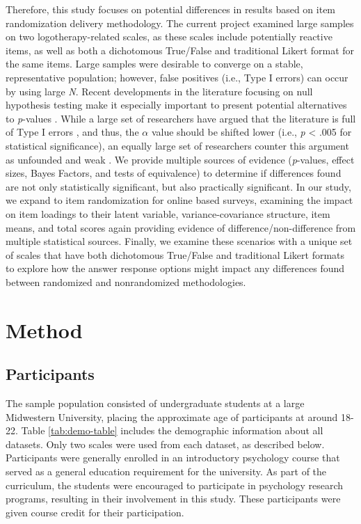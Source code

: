 \documentclass[english,man, mask]{apa6}
\theoremstyle{definition}
\theoremstyle{definition}
\theoremstyle{definition}
\theoremstyle{remark}
\begin{document}
Therefore, this study focuses on potential differences in results based
on item randomization delivery methodology. The current project examined
large samples on two logotherapy-related scales, as these scales include
potentially reactive items, as well as both a dichotomous True/False and
traditional Likert format for the same items. Large samples were
desirable to converge on a stable, representative population; however,
false positives (i.e., Type I errors) can occur by using large \emph{N}.
Recent developments in the literature focusing on null hypothesis
testing make it especially important to present potential alternatives
to \emph{p}-values \autocite{Valentine2017}. While a large set of
researchers have argued that the literature is full of Type I errors
\autocite{Benjamin2017}, and thus, the \(\alpha\) value should be
shifted lower (i.e., \emph{p} \textless{} .005 for statistical
significance), an equally large set of researchers counter this argument
as unfounded and weak \autocite{Lakens2017}. We provide multiple sources
of evidence (\emph{p}-values, effect sizes, Bayes Factors, and tests of
equivalence) to determine if differences found are not only
statistically significant, but also practically significant. In our
study, we expand to item randomization for online based surveys,
examining the impact on item loadings to their latent variable,
variance-covariance structure, item means, and total scores again
providing evidence of difference/non-difference from multiple
statistical sources. Finally, we examine these scenarios with a unique
set of scales that have both dichotomous True/False and traditional
Likert formats to explore how the answer response options might impact
any differences found between randomized and nonrandomized
methodologies.

\section{Method}\label{method}

\subsection{Participants}\label{participants}

The sample population consisted of undergraduate students at a large
Midwestern University, placing the approximate age of participants at
around 18-22. Table \ref{tab:demo-table} includes the demographic
information about all datasets. Only two scales were used from each
dataset, as described below. Participants were generally enrolled in an
introductory psychology course that served as a general education
requirement for the university. As part of the curriculum, the students
were encouraged to participate in psychology research programs,
resulting in their involvement in this study. These participants were
given course credit for their participation.
\end{document}
